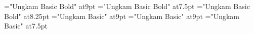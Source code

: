 \font\slnmfont="Ungkam Basic Bold" at9pt
\font\slnmfontx="Ungkam Basic Bold" at7.5pt
\font\slnmfonty="Ungkam Basic Bold" at8.25pt
\font\sldistfont="Ungkam Basic" at9pt
\font\oidfont="Ungkam Basic" at9pt
\font\zatufont="Ungkam Basic" at7.5pt

\def\sldist{\sldistfont}

\def\slnamesaunaturel#1#2#3#4#5#6#7#8{%
    \vbox{\slnamesx{#1}{#2}{#3}{#4}{#5}{#6}{#7}{#8}}%
}

\def\slnamesrowht#1#2#3#4#5#6#7#8{%
    \vbox to\pcslrowht{\slnamesx{#1}{#2}{#3}{#4}{#5}{#6}{#7}{#8}}%
}

\newbox\slnmbox
\newtoks\sldistt \newtoks\sldistiv \newtoks\sldistiii
\newbox\sldistbox \newbox\sldisttbox \newbox\sldistivbox \newbox\sldistiiibox

\def\slnamesx#1#2#3#4#5#6#7#8{%
   \setbox\slnmbox=\hbox{#1}\ifdim\wd\slnmbox>2in
     \let\slnm\slnmfontx
     \else
       \ifdim\wd\slnmbox>1.25in
         \let\slnm\slnmfonty
       \else
         \let\slnm\slnmfont
       \fi
     \fi
   \hbox to2in{\slnm#1\hfil#3}%
   \hbox{\hbox to1in{\helvy#5\hfil}\smash{\hbox to.5in{\kern.2in\vbox{\hbox{\pcssXX#4}\kern2pt}\hss}}}%
   \vfil
   \hbox{%
     #7%
     \vbox{\hbox{\hbox to.5in{\kern.05in\oidfont#2\hfil}\hbox to.5in{\hfil\zatufont#6}}}}%
}

\def\sldist{%
   \setbox\sldisttbox\hbox{\the\sldistt}%
   \setbox\sldistivbox\hbox{\the\sldistiv}%
   \setbox\sldistiiibox\hbox{\the\sldistiii}%
   \setbox\sldistbox\hbox{\oidfont\leavevmode IV:\kern2pt}%
   \vbox{\oidfont\hsize1in\parindent0pt\hangindent2em\rightskip0pt plus1fil
         \leavevmode
         \hbox to2em{\the\sldistt\hss}%
         \ifdim\wd\sldisttbox>1.9em\hskip1pt\penalty-10000\fi
         \ifdim\wd\sldistivbox>0pt\hbox{\hbox to\wd\sldistbox{IV:\kern2pt\hfil}\the\sldistiv\hfil}%
           \ifdim\wd\sldistiiibox>0pt; \penalty0\fi
         \fi
         \ifdim\wd\sldistiiibox>0pt\hbox{\hbox to\wd\sldistbox{III:\kern2pt\hfil}\the\sldistiii\hfil}\fi
         \endgraf
   }%
}

\let\sl\relax
\let\slc\relax
\let\slcc\relax
\let\cdligh\relax
\let\zatu\relax
\def\diffc{\let\ofspc\relax\pcfee}
\def\diffd{\hvfee}

\def\includegraphics#1{\XeTeXpicfile #1 scaled 925\relax}

\endinput
